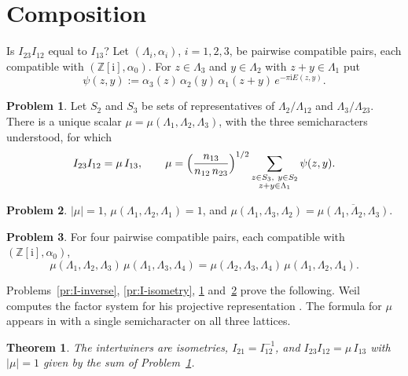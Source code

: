 \documentclass[reqno]{amsart}
\theoremstyle{definition}
\newtheorem{problem}{Problem}[section]
\theoremstyle{plain}
\newtheorem{theorem}{Theorem}[section]
\newcommand{\Z}{\mathbb{Z}}
\newcommand{\ii}{\mathrm{i}}
\begin{document}
\section{Composition}\label{sec:composition}

Is \(I_{23}I_{12}\) equal to \(I_{13}\)?  Let \((\Lambda_i,\alpha_i)\), \(i = 1, 2, 3\), be pairwise compatible pairs, each compatible with \((\Z[\ii],\alpha_0)\).  For \(z \in \Lambda_3\) and \(y \in \Lambda_2\) with \(z + y \in \Lambda_1\) put
\[
  \psi(z,y) := \alpha_3(z)\,\alpha_2(y)\,\alpha_1(z+y)\, e^{-\pi\ii E(z,y)} .
\]

\begin{problem}\label{pr:triple}
Let \(S_2\) and \(S_3\) be sets of representatives of \(\Lambda_2/\Lambda_{12}\) and \(\Lambda_3/\Lambda_{23}\).  There is a unique scalar \(\mu = \mu(\Lambda_1,\Lambda_2,\Lambda_3)\), with the three semicharacters understood, for which
\[
  I_{23} I_{12} = \mu\, I_{13},
  \qquad
  \mu = \Bigl(\frac{n_{13}}{n_{12}\, n_{23}}\Bigr)^{1/2} \sum_{\substack{z \in S_3,\ y \in S_2 \\ z + y \in \Lambda_1}} \psi(z,y) .
\]
\end{problem}

\begin{problem}\label{pr:mu-abs}
\(\lvert\mu\rvert = 1\), \(\mu(\Lambda_1,\Lambda_2,\Lambda_1) = 1\), and \(\mu(\Lambda_1,\Lambda_3,\Lambda_2) = \overline{\mu(\Lambda_1,\Lambda_2,\Lambda_3)}\).
\end{problem}

\begin{problem}\label{pr:cocycle}
For four pairwise compatible pairs, each compatible with \((\Z[\ii],\alpha_0)\),
\[
  \mu(\Lambda_1,\Lambda_2,\Lambda_3)\,\mu(\Lambda_1,\Lambda_3,\Lambda_4) = \mu(\Lambda_2,\Lambda_3,\Lambda_4)\,\mu(\Lambda_1,\Lambda_2,\Lambda_4) .
\]
\end{problem}

Problems~\ref{pr:I-inverse}, \ref{pr:I-isometry}, \ref{pr:triple} and~\ref{pr:mu-abs} prove the following.  Weil computes the factor system for his projective representation \cite{We}.  The formula for \(\mu\) appears in \cite[Lemma~7.3(ii)]{Adr} with a single semicharacter on all three lattices.

\begin{theorem}\label{thm:compose}
The intertwiners are isometries, \(I_{21} = I_{12}^{-1}\), and \(I_{23}I_{12} = \mu\, I_{13}\) with \(\lvert\mu\rvert = 1\) given by the sum of Problem~\ref{pr:triple}.
\end{theorem}
\end{document}
